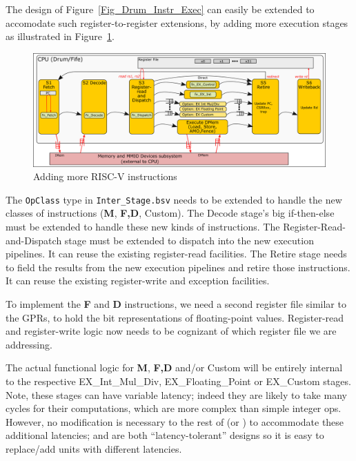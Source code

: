 The {\DRUM} design of Figure~\ref{Fig_Drum_Instr_Exec} can easily be
extended to accomodate such register-to-register extensions, by adding
more execution stages as illustrated in
Figure~\ref{Fig_Additional_RISCV_Instructions}.
\begin{figure}[htbp]
  \centerline{\includegraphics[width=6in,angle=0]{Figures/RSN_2025-09-01.000.00_FifeDrum_Stages_Multilayer_L1_L4}}
  \caption{\label{Fig_Additional_RISCV_Instructions}
           Adding more RISC-V instructions}
\end{figure}

The {\tt OpClass} type in {\tt Inter\_Stage.bsv} needs to be extended
to handle the new classes of instructions ({\bf M}, {\bf F,D},
Custom).  The Decode stage's big if-then-else must be extended to
handle these new kinds of instructions.  The
Register-Read-and-Dispatch stage must be extended to dispatch into the
new execution pipelines.  It can reuse the existing register-read
facilities.  The Retire stage needs to field the results from the new
execution pipelines and retire those instructions.  It can reuse the
existing register-write and exception facilities.

To implement the {\bf F} and {\bf D} instructions, we need a second
register file similar to the GPRs, to hold the bit representations of
floating-point values.  Register-read and register-write logic now
needs to be cognizant of which register file we are addressing.


The actual functional logic for {\bf M}, {\bf F,D} and/or Custom will
be entirely internal to the respective EX\_Int\_Mul\_Div,
EX\_Floating\_Point or EX\_Custom stages.  Note, these stages can have
variable latency; indeed they are likely to take many cycles for their
computations, which are more complex than simple integer ops.
However, no modification is necessary to the rest of {\DRUM} (or
{\FIFE}) to accommodate these additional latencies; {\DRUM} and
{\FIFE} are both ``latency-tolerant'' designs so it is easy to
replace/add units with different latencies.


